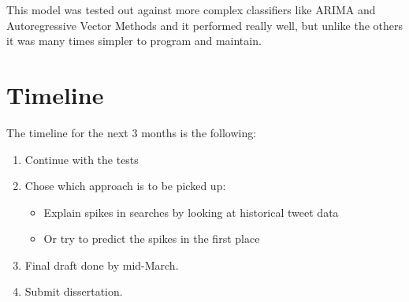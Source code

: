 \documentclass[minf,frontabs,twoside,singlespacing,parskip]{infthesis}
\begin{document}
This model was tested out against more complex classifiers like ARIMA and Autoregressive Vector Methods and it performed really well, but unlike the others it was many times simpler to program and maintain.


\chapter{Timeline}

The timeline for the next 3 months is the following:
\begin{enumerate}
\item Continue with the tests
\item Chose which approach is to be picked up:
\begin{itemize}
\item Explain spikes in searches by looking at historical tweet data
\item Or try to predict the spikes in the first place
\end{itemize}
\item Final draft done by mid-March.
\item Submit dissertation.
\end{enumerate}


\end{document}
